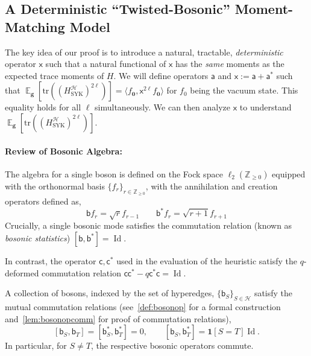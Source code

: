 \documentclass
[11pt,letterpaper]
{article}
\theoremstyle{definition}
\newcommand{\sfc}{\mathsf c}
\newcommand{\sfa}{\mathsf a}
\newcommand{\sfx}{\mathsf x}
\newcommand{\sfb}{\mathsf b}
\newcommand{\1}{\mathbf{1}}
\newcommand{\tr}{\mathrm{tr}}
\newcommand{\Z}{\mathbb Z}
\newcommand{\cH}{\mathcal H}
\newcommand{\Id}{\operatorname{Id}}
\DeclareMathOperator*{\E}{\mathbb{E}}
\renewcommand{\geq}{\geqslant}
\begin{document}
 \subsection{A Deterministic ``Twisted-Bosonic'' Moment-Matching Model}


The key idea of our proof is to introduce a natural, tractable,  \emph{deterministic} operator $\sfx$ such that a natural functional of $\sfx$ has the \emph{same} moments as the expected trace moments of $H$.  We will define operators $\sfa$ and $\sfx:= \sfa + \sfa^*$ such that $\E_{\bm g}\left[\tr((H^\cH_{\operatorname{SYK}})^{2\ell})\right] = \langle f_{\bm 0}, \sfx^{2\ell}f_{\bm 0}\rangle$ for $f_0$ being the vacuum state. This equality holds for all $\ell$ simultaneously. We can then analyze $\sfx$ to understand $\E_{\bm g}\left[\tr((H^\cH_{\operatorname{SYK}})^{2\ell})\right]$. 

\paragraph{Review of Bosonic Algebra:} The algebra for a single boson is defined on the Fock space $\ell_2(\Z_{\geq 0})$ equipped with the orthonormal basis $\{f_r\}_{r\in \Z_{\geq 0}}$, with the annihilation and creation operators defined as, 
\[
\sfb f_r = \sqrt{r}f_{r-1} \qquad \sfb^* f_r = \sqrt{r+1}f_{r+1}
\]
Crucially, a single bosonic mode satisfies the commutation relation (known as \emph{bosonic statistics}) $[\sfb, \sfb^*] =\Id$. 


In contrast, the operator $\sfc,\sfc^*$ used in the evaluation of the heuristic satisfy the $q$-deformed commutation relation $\sfc\sfc^* - q \sfc^*\sfc = \Id$.

A collection of bosons, indexed by the set of hyperedges, $\{\sfb_S\}_{S\in\cH}$ satisfy the mutual commutation relations (see~\cref{def:bosonop} for a formal construction and~\cref{lem:bosonopcomm} for proof of commutation relations),
\[
[\sfb_S,\sfb_T]=[\sfb_S^*,\sfb_T^*]=0,
\qquad
[\sfb_S,\sfb_T^*]=\1[S=T]\Id.
\]
In particular, for $S\neq T$, the respective bosonic operators commute.
\end{document}

